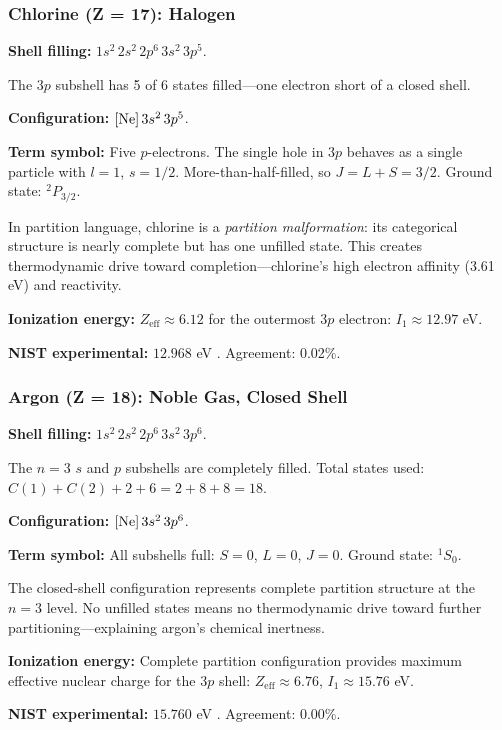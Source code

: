\documentclass[11pt,twocolumn,a4paper]{article}
\theoremstyle{definition}
\theoremstyle{remark}
\begin{document}
\subsubsection{Chlorine (Z = 17): Halogen}

\textbf{Shell filling:} $1s^2\,2s^2\,2p^6\,3s^2\,3p^5$.

The $3p$ subshell has 5 of 6 states filled---one electron short of a closed shell.

\textbf{Configuration:} $[{\rm Ne}]\,3s^2\,3p^5$.

\textbf{Term symbol:} Five $p$-electrons. The single hole in $3p$ behaves as a single particle with $l = 1$, $s = 1/2$. More-than-half-filled, so $J = L + S = 3/2$. Ground state: ${}^2P_{3/2}$.

In partition language, chlorine is a \emph{partition malformation}: its categorical structure is nearly complete but has one unfilled state. This creates thermodynamic drive toward completion---chlorine's high electron affinity (3.61 eV) and reactivity.

\textbf{Ionization energy:} $Z_{\mathrm{eff}} \approx 6.12$ for the outermost $3p$ electron: $I_1 \approx 12.97$ eV.

\textbf{NIST experimental:} $12.968$ eV \citep{nist_asd}. Agreement: 0.02\%.

\subsubsection{Argon (Z = 18): Noble Gas, Closed Shell}

\textbf{Shell filling:} $1s^2\,2s^2\,2p^6\,3s^2\,3p^6$.

The $n = 3$ $s$ and $p$ subshells are completely filled. Total states used: $C(1) + C(2) + 2 + 6 = 2 + 8 + 8 = 18$.

\textbf{Configuration:} $[{\rm Ne}]\,3s^2\,3p^6$.

\textbf{Term symbol:} All subshells full: $S = 0$, $L = 0$, $J = 0$. Ground state: ${}^1S_0$.

The closed-shell configuration represents complete partition structure at the $n = 3$ level. No unfilled states means no thermodynamic drive toward further partitioning---explaining argon's chemical inertness.

\textbf{Ionization energy:} Complete partition configuration provides maximum effective nuclear charge for the $3p$ shell: $Z_{\mathrm{eff}} \approx 6.76$, $I_1 \approx 15.76$ eV.

\textbf{NIST experimental:} $15.760$ eV \citep{nist_asd}. Agreement: 0.00\%.
\end{document}
